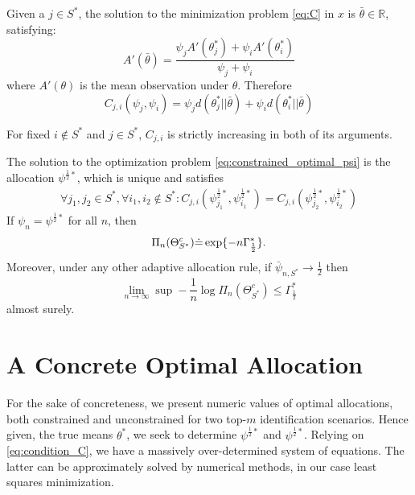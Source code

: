 \begin{lemma}\label{lemma:C_unique_solution}
  Given a $j \in S^*$, the solution to the minimization problem \eqref{eq:C} in $x$ is $\bar{\theta} \in \mathbb{R}$, satisfying:
  \[A'(\bar{\theta}) = \frac{\psi_j A'(\theta_j^*) + \psi_i A'(\theta_i^*)}{\psi_j + \psi_i}\]
  where $A'(\theta)$ is the mean observation under $\theta$. Therefore
  \[C_{j, i}(\psi_j, \psi_i) = \psi_j d(\theta^*_j || \bar{\theta}) + \psi_i d(\theta^*_i || \bar{\theta})\]
\end{lemma}

\begin{lemma}\label{lemma:C_strictly_increasing}
  For fixed $i \notin S^*$ and $j \in S^*$, $C_{j, i}$ is strictly increasing in both of its arguments.
\end{lemma}

\begin{proposition}\label{proposition:characterization}
  The solution to the optimization problem \ref{eq:constrained_optimal_psi} is the allocation $\psi^{\frac{1}{2}*}$, which is unique and satisfies
  \begin{align}
    \forall j_1, j_2 \in S^*, \forall i_1, i_2 \notin S^*: C_{j, i}(\psi^{\frac{1}{2}*}_{j_1}, \psi^{\frac{1}{2}*}_{i_1}) = C_{j, i}(\psi^{\frac{1}{2}*}_{j_2}, \psi^{\frac{1}{2}*}_{i_2})\label{eq:condition_C}
  \end{align}
  If $\psi_n = \psi^{\frac{1}{2}*}$ for all $n$, then
  \[\Pi_n(\Theta_{S^*}^c) \dot{=} \exp \{-n\Gamma^*_{\frac{1}{2}}\}.\]
  Moreover, under any other adaptive allocation rule, if $\bar{\psi}_{n, S^*} \rightarrow \frac{1}{2}$ then
  \[\lim_{n \rightarrow \infty} \sup - \frac{1}{n} \log \Pi_n(\Theta^c_{S^*}) \leq \Gamma^*_{\frac{1}{2}}\]
  almost surely.
\end{proposition}

\section{A Concrete Optimal Allocation}\label{section:concrete_optimal_allocation}
For the sake of concreteness, we present numeric values of optimal allocations, both constrained and unconstrained for two top-$m$ identification scenarios.
Hence given, the true means $\theta^*$, we seek to determine $\psi^{\frac{1}{2}*}$ and $\psi^{\frac{1}{2}*}$. Relying on \eqref{eq:condition_C}, we have a massively over-determined system of equations. The latter can be approximately solved by numerical methods, in our case least squares minimization.

